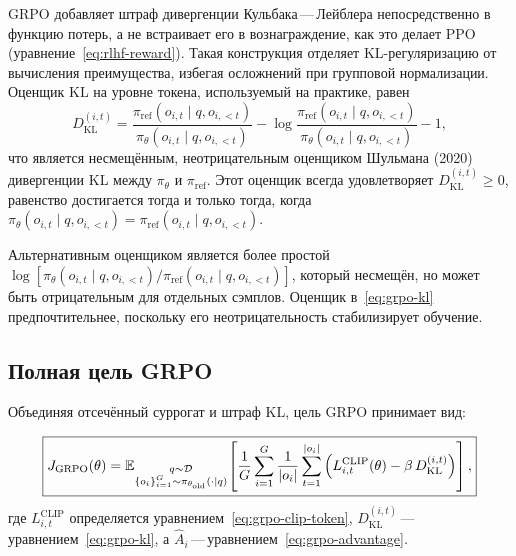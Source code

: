 GRPO добавляет штраф дивергенции Кульбака\,---\,Лейблера непосредственно в функцию потерь, а не встраивает его в вознаграждение, как это делает PPO (уравнение~\eqref{eq:rlhf-reward}). Такая конструкция отделяет KL-регуляризацию от вычисления преимущества, избегая осложнений при групповой нормализации. Оценщик KL на уровне токена, используемый на практике, равен
\begin{equation}
\label{eq:grpo-kl}
D_{\mathrm{KL}}^{(i,t)} = \frac{\pi_\mathrm{ref}(o_{i,t} \mid q, o_{i,<t})}{\pi_\theta(o_{i,t} \mid q, o_{i,<t})} - \log\frac{\pi_\mathrm{ref}(o_{i,t} \mid q, o_{i,<t})}{\pi_\theta(o_{i,t} \mid q, o_{i,<t})} - 1,
\end{equation}
что является несмещённым, неотрицательным оценщиком Шульмана (2020) дивергенции KL между $\pi_\theta$ и $\pi_\mathrm{ref}$. Этот оценщик всегда удовлетворяет $D_{\mathrm{KL}}^{(i,t)} \geq 0$, равенство достигается тогда и только тогда, когда $\pi_\theta(o_{i,t} \mid q, o_{i,<t}) = \pi_\mathrm{ref}(o_{i,t} \mid q, o_{i,<t})$.

\begin{remark}
Альтернативным оценщиком является более простой $\log[\pi_\theta(o_{i,t} \mid q, o_{i,<t}) / \pi_\mathrm{ref}(o_{i,t} \mid q, o_{i,<t})]$, который несмещён, но может быть отрицательным для отдельных сэмплов. Оценщик в~\eqref{eq:grpo-kl} предпочтительнее, поскольку его неотрицательность стабилизирует обучение.
\end{remark}

\subsection{Полная цель GRPO}

Объединяя отсечённый суррогат и штраф KL, цель GRPO принимает вид:

\begin{definition}
\label{def:grpo-objective}
\begin{equation}
\label{eq:grpo-objective}
\boxed{
J_{\mathrm{GRPO}}(\theta)
= \operatorname{\mathbb{E}}_{\substack{q \sim \mathcal{D} \\ \{o_i\}_{i=1}^G \sim \pi_{\theta_\mathrm{old}}(\cdot|q)}}
\!\left[
\frac{1}{G}\sum_{i=1}^{G} \frac{1}{|o_i|}\sum_{t=1}^{|o_i|}
\Big(
  L_{i,t}^{\mathrm{CLIP}}(\theta)
  - \beta\, D_{\mathrm{KL}}^{(i,t)}
\Big)
\right],
}
\end{equation}
где $L_{i,t}^{\mathrm{CLIP}}$ определяется уравнением~\eqref{eq:grpo-clip-token}, $D_{\mathrm{KL}}^{(i,t)}$\,---\,уравнением~\eqref{eq:grpo-kl}, а $\hat{A}_i$\,---\,уравнением~\eqref{eq:grpo-advantage}.
\end{definition}

